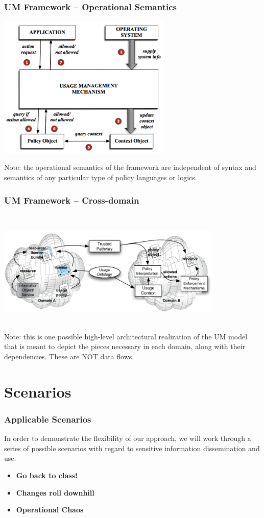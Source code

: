 \documentclass[t,handout, 10pt]{beamer}
\begin{document}
\begin{frame}\frametitle{UM Framework -- Operational Semantics}
  \centerline{\includegraphics[width=3.25in]{UM-working.png}}
  {\small Note:  the operational semantics of the framework are independent of syntax and semantics of any particular type of policy languages or logics.}
\end{frame}  
  
\begin{frame}\frametitle{UM Framework -- Cross-domain}
~\\  \centerline{\includegraphics[width=4.25in]{UM-highlevel.pdf}}~\\
  {\small Note: this is one possible high-level architectural realization of the UM model that is meant to depict the pieces necessary in each domain, along with their dependencies. These are NOT data flows.}
\end{frame}  

\section{Scenarios}

\begin{frame}
\frametitle{Applicable Scenarios}
In order to demonstrate the flexibility of our approach, we will work through a series of possible scenarios with regard to sensitive information dissemination and use.
\newline
\pause
\begin{itemize}
\item \textbf{Go back to class!}
\pause
\item \textbf{Changes roll downhill}
\pause
\item \textbf{Operational Chaos}
\end{itemize}
\end{frame}
\end{document}
